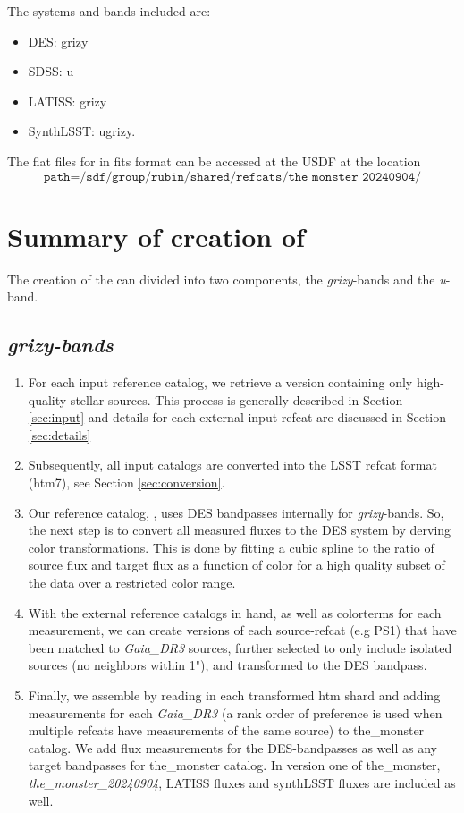 The systems and bands included are:
\begin{itemize}
    \item DES: grizy
    \item SDSS: u
    \item LATISS: grizy
    \item SynthLSST: ugrizy.
\end{itemize}

The flat files for \monster in fits format can be accessed at the USDF at the location
$$\texttt{path=/sdf/group/rubin/shared/refcats/the\_monster\_20240904/}$$


\section{Summary of creation of \monster}
\label{sec:summary}
The creation of the \monster can divided into two components, the \textit{grizy}-bands and the \textit{u}-band. 


\subsection{\textit{grizy-bands}}
\begin{enumerate}
    \item For each input reference catalog, we retrieve a version containing only high-quality stellar sources. This process is generally described in Section \ref{sec:input} and details for each external input refcat are discussed in Section \ref{sec:details}
    \item Subsequently, all input catalogs are converted into the LSST refcat format (htm7), see Section \ref{sec:conversion}.
    \item Our reference catalog, \monster, uses DES bandpasses internally for \textit{grizy}-bands. So, the next step is to convert all measured fluxes to the DES system by derving color transformations. 
    This is done by fitting a cubic spline to the ratio of source flux and target flux as a function of color for a high quality subset of the data over a restricted color range.
    \item With the external reference catalogs in hand, as well as colorterms for each measurement, we can create versions of each source-refcat (e.g PS1) that have been matched to \textit{Gaia\_DR3} sources, further selected to only include isolated sources (no neighbors within 1"), and transformed to the DES bandpass.
    \item Finally, we assemble \monster by reading in each transformed htm shard and adding measurements for each \textit{Gaia\_DR3} (a rank order of preference is used when multiple refcats have measurements of the same source) to the\_monster catalog. 
    We add flux measurements for the DES-bandpasses as well as any target bandpasses for the\_monster catalog. In version one of the\_monster, \textit{the\_monster\_20240904}, LATISS fluxes and synthLSST fluxes are included as well.
\end{enumerate}

